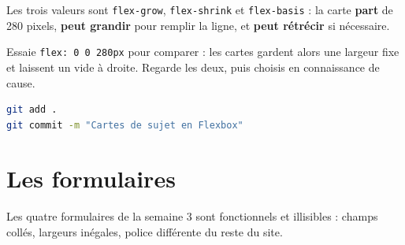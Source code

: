 \documentclass[a4paper,11pt]{article}
\begin{document}
\begin{tcolorbox}[astuce, title={Comprendre \texttt{flex: 1 1 280px}}]
Les trois valeurs sont \texttt{flex-grow}, \texttt{flex-shrink} et \texttt{flex-basis} : la carte \textbf{part} de 280 pixels, \textbf{peut grandir} pour remplir la ligne, et \textbf{peut rétrécir} si nécessaire.

\vspace{3pt}
Essaie \texttt{flex: 0 0 280px} pour comparer : les cartes gardent alors une largeur fixe et laissent un vide à droite. Regarde les deux, puis choisis en connaissance de cause.
\end{tcolorbox}

\begin{tcolorbox}[astuce, title={Point d'étape}]
\begin{lstlisting}[language=bash, numbers=none]
git add .
git commit -m "Cartes de sujet en Flexbox"
\end{lstlisting}
\end{tcolorbox}

\section{Les formulaires}

Les quatre formulaires de la semaine 3 sont fonctionnels et illisibles : champs collés, largeurs inégales, police différente du reste du site.
\end{document}
